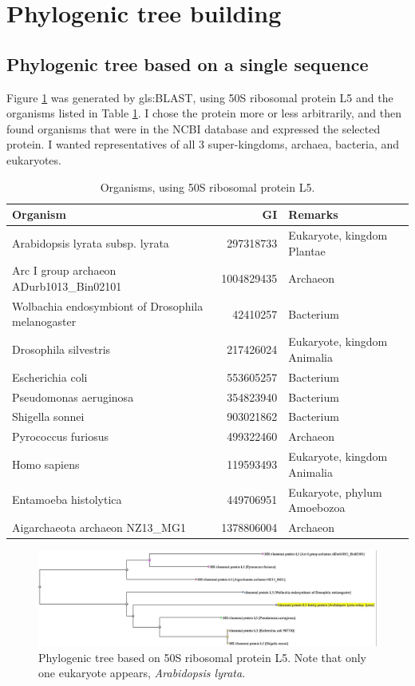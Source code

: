 \documentclass[]{article}
\begin{document}
\section{Phylogenic tree building}

\subsection{Phylogenic tree based on a single sequence}

Figure \ref{fig:Phylo1} was generated by \gls{gls:BLAST}, using 50S ribosomal protein L5 and the organisms listed in Table \ref{tab:organisms}. I chose the protein more or less arbitrarily, and then found organisms that were in the NCBI database and expressed the selected protein. I wanted representatives of all 3 super-kingdoms, archaea, bacteria, and eukaryotes.

\begin{table}[H]
	\caption{Organisms, using 50S ribosomal protein L5.}\label{tab:organisms}
	\centering
	\begin{tabular}{|l |r | p{5cm} |}
		\hline
		\textbf{Organism} & \textbf{GI} & \textbf{Remarks}\\ \hline
		Arabidopsis lyrata subsp. lyrata &297318733 & Eukaryote,  kingdom Plantae \\ \hline
		Arc I group archaeon ADurb1013\_Bin02101&1004829435&Archaeon\\ \hline
		Wolbachia endosymbiont of Drosophila melanogaster  &42410257 &Bacterium \\ \hline
		Drosophila silvestris&217426024&Eukaryote, kingdom Animalia\\\hline
		Escherichia coli &553605257 & Bacterium\\ \hline
		Pseudomonas aeruginosa &354823940 & Bacterium\\ \hline
		Shigella sonnei &903021862 &Bacterium \\ \hline
		Pyrococcus furiosus &499322460 &Archaeon \\ \hline
		Homo sapiens & 119593493&Eukaryote, kingdom Animalia  \\ \hline
		Entamoeba histolytica  &449706951&Eukaryote, phylum Amoebozoa\\ \hline
		Aigarchaeota archaeon NZ13\_MG1&1378806004&Archaeon\\ \hline
	\end{tabular}
\end{table}

\begin{figure}[H]
	\caption{Phylogenic tree based on 50S ribosomal protein L5.  Note that only one eukaryote appears, \textit{Arabidopsis lyrata}.}\label{fig:Phylo1}
	\includegraphics[width=\textwidth]{Phylo1}
\end{figure}
\end{document}
